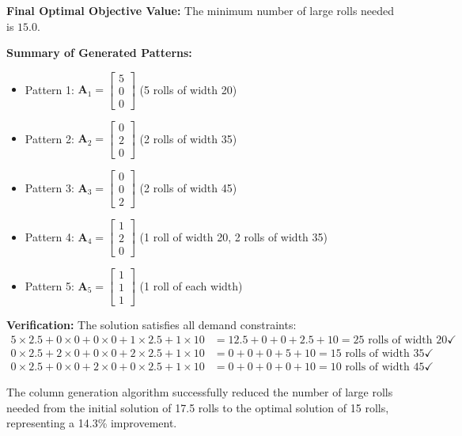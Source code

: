 \documentclass[11pt]{article}
\newcommand{\mb}[1]{\ensuremath{\boldsymbol{#1}}}
\begin{document}
\begin{enumerate}
\begin{enumerate}
\textbf{Final Optimal Objective Value:}
The minimum number of large rolls needed is $\mathbf{15.0}$.

\textbf{Summary of Generated Patterns:}
\begin{itemize}
\item Pattern 1: $\mb{A}_1 = \begin{bmatrix} 5 \\ 0 \\ 0\end{bmatrix}$ (5 rolls of width 20)
\item Pattern 2: $\mb{A}_2 = \begin{bmatrix} 0 \\ 2 \\ 0\end{bmatrix}$ (2 rolls of width 35)
\item Pattern 3: $\mb{A}_3 = \begin{bmatrix} 0 \\ 0 \\ 2\end{bmatrix}$ (2 rolls of width 45)
\item Pattern 4: $\mb{A}_4 = \begin{bmatrix} 1 \\ 2 \\ 0\end{bmatrix}$ (1 roll of width 20, 2 rolls of width 35)
\item Pattern 5: $\mb{A}_5 = \begin{bmatrix} 1 \\ 1 \\ 1\end{bmatrix}$ (1 roll of each width)
\end{itemize}

\textbf{Verification:}
The solution satisfies all demand constraints:
\begin{align*}
5 \times 2.5 + 0 \times 0 + 0 \times 0 + 1 \times 2.5 + 1 \times 10 &= 12.5 + 0 + 0 + 2.5 + 10 = 25 \text{ rolls of width 20} \checkmark \\
0 \times 2.5 + 2 \times 0 + 0 \times 0 + 2 \times 2.5 + 1 \times 10 &= 0 + 0 + 0 + 5 + 10 = 15 \text{ rolls of width 35} \checkmark \\
0 \times 2.5 + 0 \times 0 + 2 \times 0 + 0 \times 2.5 + 1 \times 10 &= 0 + 0 + 0 + 0 + 10 = 10 \text{ rolls of width 45} \checkmark
\end{align*}

The column generation algorithm successfully reduced the number of large rolls needed from the initial solution of 17.5 rolls to the optimal solution of 15 rolls, representing a 14.3\% improvement.



\end{enumerate}
\end{enumerate}
\end{document}
